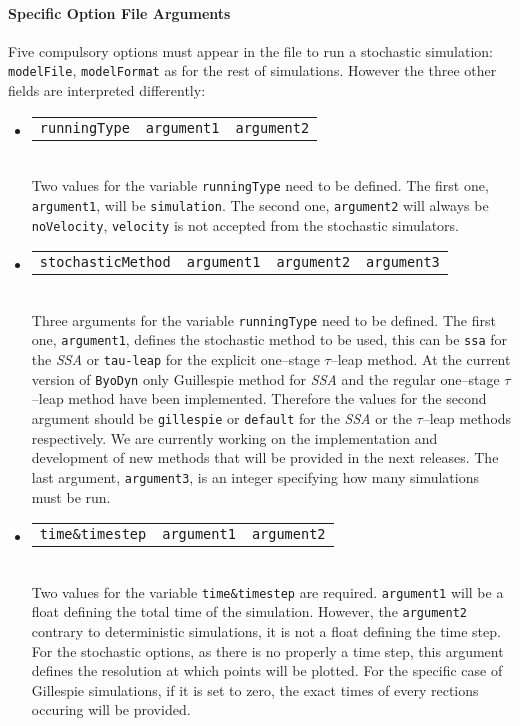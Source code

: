 \documentclass[a4paper, 11pt]{article}
\begin{document}
\paragraph{Specific Option File Arguments} \label{simulationFileArguments}
Five compulsory options must appear in the file to run a stochastic simulation: \texttt{modelFile}, \texttt{modelFormat} as for the rest of simulations. 
However the three other fields are interpreted differently:
\begin{itemize}
\item \begin{tabular}{ccc}\texttt{runningType}&\texttt{argument1}&\texttt{argument2}\end{tabular}\\[1.5ex]
  Two values for the variable \texttt{runningType} need to be defined. 
  The first one, \texttt{argument1}, will be \texttt{simulation}.
  The second one, \texttt{argument2} will always be \texttt{noVelocity}, \texttt{velocity} is not accepted from the stochastic simulators.
\item \begin{tabular}{cccc}\texttt{stochasticMethod}&\texttt{argument1}&\texttt{argument2}&\texttt{argument3}\end{tabular}\\[1.5ex]
  Three arguments for the variable \texttt{runningType} need to be defined. 
  The first one, \texttt{argument1}, defines the stochastic method to be used, this can be \texttt{ssa} for the \emph{SSA} or \texttt{tau-leap} for the explicit one--stage $\tau$--leap method.
  At the current version of \texttt{ByoDyn} only Guillespie method for \emph{SSA} and the regular one--stage $\tau$--leap method have been implemented. 
  Therefore the values for the second argument should be \texttt{gillespie} or \texttt{default} for the \emph{SSA} or the $\tau$--leap methods respectively.
  We are currently working on the implementation and development of new methods that will be provided in the next releases.
  The last argument, \texttt{argument3}, is an integer specifying how many simulations must be run.
\item \begin{tabular}{ccc}\texttt{time\&timestep}&\texttt{argument1}&\texttt{argument2}\end{tabular}\\[1.5ex]
  Two values for the variable \texttt{time\&timestep} are required.
  \texttt{argument1} will be a float defining the total time of the simulation.
  However, the \texttt{argument2} contrary to deterministic simulations, it is not a float defining the time step. 
  For the stochastic options, as there is no properly a time step, this argument defines the resolution at which points will be plotted.
  For the specific case of Gillespie simulations, if it is set to zero, the exact times of every rections occuring will be provided.
\end{itemize}
\end{document}
